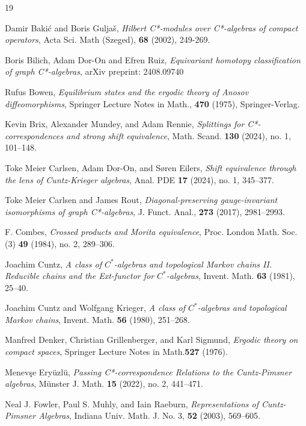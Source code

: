 \documentclass[11pt, letterpaper,final]{amsart}
\theoremstyle{definition}
\begin{document}
\begin{thebibliography}{19}


 Damir Baki\'c and Boris Gulja\v s, \emph{Hilbert C*-modules over C*-algebras of compact operators}, Acta Sci. Math (Szeged), \textbf{68} (2002), 249-269.

Boris Bilich, Adam Dor-On and Efren Ruiz, \emph{Equivariant homotopy classification of graph C*-algebras}, arXiv preprint: 2408.09740

 Rufus Bowen, \emph{Equilibrium states and the ergodic theory of Anosov diffeomorphisms}, Springer Lecture Notes in Math., \textbf{470} (1975), Springer-Verlag.


 Kevin Brix,  Alexander Mundey, and Adam Rennie, \emph{Splittings for C*-correspondences and strong shift equivalence}, Math. Scand. \textbf{130} (2024), no. 1, 101--148.


 Toke Meier Carlsen, Adam Dor-On, and S{\o}ren Eilers, \emph{Shift equivalence through the lens of Cuntz-Krieger algebras}, Anal. PDE \textbf{17} (2024), no. 1, 345--377.

 Toke Meier Carlsen and James Rout, \emph{Diagonal-preserving gauge-invariant isomorphisms of graph C*-algebras}, J. Funct. Anal., \textbf{273} (2017), 2981--2993.

 F. Combes, \emph{Crossed products and Morita equivalence}, Proc. London Math. Soc. (3) \textbf{49} (1984), no. 2, 289--306.


Joachim Cuntz, \emph{A class of {$C^{\ast} $}-algebras and topological {M}arkov chains II. Reducible chains and the {E}xt-functor for {$C^{\ast} $}-algebras}, Invent. Math. \textbf{63} (1981), 25--40.

Joachim Cuntz and Wolfgang Krieger, \emph{A class of {$C^{\ast} $}-algebras and topological {M}arkov chains},
Invent. Math. \textbf{56} (1980), 251--268.

 Manfred Denker, Christian Grillenberger, and Karl Sigmund, \emph{Ergodic theory on compact spaces}, Springer Lecture Notes in Math.\textbf{527} (1976).


  Menev\c{s}e Ery\"{u}zl\"{u}, \emph{Passing {C*}-correspondence Relations to the Cuntz-Pimsner algebras}, M\"{u}nster J. Math. \textbf{15} (2022), no. 2, 441--471.

 Neal J. Fowler, Paul S. Muhly, and Iain Raeburn, \emph{Representations of Cuntz-Pimsner Algebras}, Indiana Univ. Math. J. No. 3, \textbf{52} (2003), 569--605.


\end{thebibliography}
\end{document}

